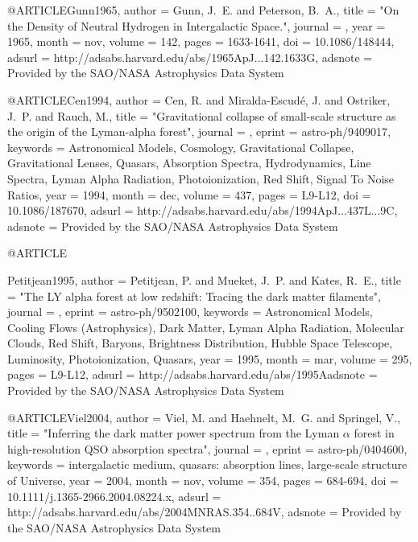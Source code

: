 \documentclass{aa}
\begin{document}
{{{{{{{{{{{@ARTICLE{Gunn1965,
   author = {{Gunn}, J.~E. and {Peterson}, B.~A.},
    title = "{On the Density of Neutral Hydrogen in Intergalactic Space.}",
  journal = {\apj},
     year = 1965,
    month = nov,
   volume = 142,
    pages = {1633-1641},
      doi = {10.1086/148444},
   adsurl = {http://adsabs.harvard.edu/abs/1965ApJ...142.1633G},
  adsnote = {Provided by the SAO/NASA Astrophysics Data System}
}

@ARTICLE{Cen1994,
   author = {{Cen}, R. and {Miralda-Escud{\'e}}, J. and {Ostriker}, J.~P. and 
	{Rauch}, M.},
    title = "{Gravitational collapse of small-scale structure as the origin of the Lyman-alpha forest}",
  journal = {\apjl},
   eprint = {astro-ph/9409017},
 keywords = {Astronomical Models, Cosmology, Gravitational Collapse, Gravitational Lenses, Quasars, Absorption Spectra, Hydrodynamics, Line Spectra, Lyman Alpha Radiation, Photoionization, Red Shift, Signal To Noise Ratios},
     year = 1994,
    month = dec,
   volume = 437,
    pages = {L9-L12},
      doi = {10.1086/187670},
   adsurl = {http://adsabs.harvard.edu/abs/1994ApJ...437L...9C},
  adsnote = {Provided by the SAO/NASA Astrophysics Data System}
}

@ARTICLE{Petitjean1995,
   author = {{Petitjean}, P. and {Mueket}, J.~P. and {Kates}, R.~E.},
    title = "{The LY alpha forest at low redshift: Tracing the dark matter filaments}",
  journal = {\aap},
   eprint = {astro-ph/9502100},
 keywords = {Astronomical Models, Cooling Flows (Astrophysics), Dark Matter, Lyman Alpha Radiation, Molecular Clouds, Red Shift, Baryons, Brightness Distribution, Hubble Space Telescope, Luminosity, Photoionization, Quasars},
     year = 1995,
    month = mar,
   volume = 295,
    pages = {L9-L12},
   adsurl = {http://adsabs.harvard.edu/abs/1995Aadsnote = {Provided by the SAO/NASA Astrophysics Data System}
}

@ARTICLE{Viel2004,
   author = {{Viel}, M. and {Haehnelt}, M.~G. and {Springel}, V.},
    title = "{Inferring the dark matter power spectrum from the Lyman {$\alpha$} forest in high-resolution QSO absorption spectra}",
  journal = {\mnras},
   eprint = {astro-ph/0404600},
 keywords = {intergalactic medium, quasars: absorption lines, large-scale structure of Universe},
     year = 2004,
    month = nov,
   volume = 354,
    pages = {684-694},
      doi = {10.1111/j.1365-2966.2004.08224.x},
   adsurl = {http://adsabs.harvard.edu/abs/2004MNRAS.354..684V},
  adsnote = {Provided by the SAO/NASA Astrophysics Data System}
}

}}}}}}}}}}}}
\end{document}
